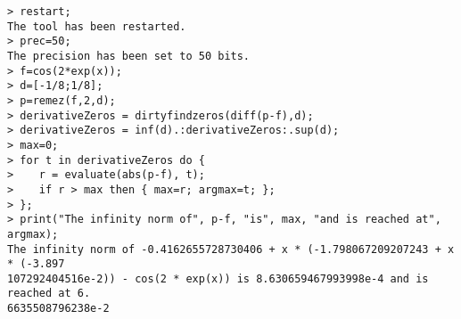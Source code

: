 \begin{center}\begin{minipage}{15cm}\begin{Verbatim}[frame=single]
> restart;
The tool has been restarted.
> prec=50;
The precision has been set to 50 bits.
> f=cos(2*exp(x));
> d=[-1/8;1/8];
> p=remez(f,2,d);
> derivativeZeros = dirtyfindzeros(diff(p-f),d);
> derivativeZeros = inf(d).:derivativeZeros:.sup(d);
> max=0;
> for t in derivativeZeros do {
>    r = evaluate(abs(p-f), t);
>    if r > max then { max=r; argmax=t; };
> };
> print("The infinity norm of", p-f, "is", max, "and is reached at", argmax);
The infinity norm of -0.4162655728730406 + x * (-1.798067209207243 + x * (-3.897
107292404516e-2)) - cos(2 * exp(x)) is 8.630659467993998e-4 and is reached at 6.
6635508796238e-2
\end{Verbatim}
\end{minipage}\end{center}
